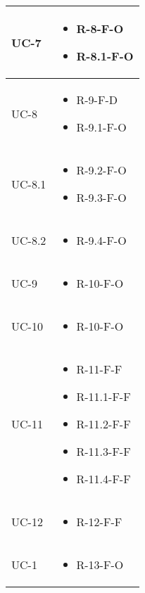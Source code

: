 \begin{center}
\begin{longtable}{| C{6cm} |C{6cm}|}
    UC-7 &
    \begin{itemize}
        \item R-8-F-O
        \item R-8.1-F-O
    \end{itemize}  \\\hline
    UC-8 &
    \begin{itemize}
        \item R-9-F-D
        \item R-9.1-F-O
    \end{itemize}\\\hline
    UC-8.1 &
    \begin{itemize}
        \item R-9.2-F-O
        \item R-9.3-F-O
    \end{itemize} \\\hline
    UC-8.2 &
    \begin{itemize}
        \item R-9.4-F-O
    \end{itemize}\\\hline
    UC-9 & \begin{itemize}
               \item R-10-F-O
    \end{itemize}\\\hline
    UC-10 &
    \begin{itemize}
        \item R-10-F-O
    \end{itemize}
    \\\hline
    UC-11 &
    \begin{itemize}
        \item R-11-F-F
        \item R-11.1-F-F
        \item R-11.2-F-F
        \item R-11.3-F-F
        \item R-11.4-F-F
    \end{itemize}
    \\\hline


    UC-12 &
    \begin{itemize}
        \item R-12-F-F
    \end{itemize}
    \\\hline

    UC-1 &
    \begin{itemize}
        \item R-13-F-O
    \end{itemize}
    \\\hline


\end{longtable}
\end{center}
